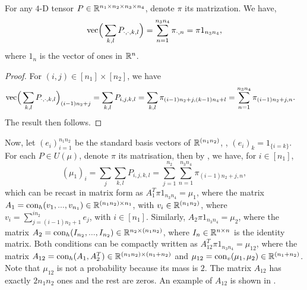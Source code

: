 \begin{lemma} \label{vec_mat}
  For any $4$-D tensor $P \in \mathbb R^{n_1 \times n_2 \times n_3 \times n_4}$,
  denote $\pi$ its matrization. We have,
  \begin{equation}
    \text{vec} \Big( \sum_{k,l} P_{\cdot, \cdot, k, l} \Big) = \sum_{n=1}^{n_3 n_4} \pi_{\cdot, n} = \pi 1_{n_3 n_4},
  \end{equation}
  where $1_n$ is the vector of ones in $\mathbb R^n$.
\end{lemma}
\begin{proof}
For $(i,j) \in [n_1] \times [n_2]$, we have
\begin{align}
    \text{vec} \Big(\sum_{k,l} P_{\cdot,\cdot, k, l}\Big)_{(i-1)n_2 + j} &= \sum_{k,l} P_{i,j,k,l}
    = \sum_{k,l} \pi_{(i-1) n_2 + j, (k-1) n_4 + l}
    = \sum_{n=1}^{n_3 n_4} \pi_{(i-1) n_2 + j, n}.
\end{align}
The result then follows.
\end{proof}
Now, let $(e_i)_{i=1}^{n_1 n_2}$ be the standard basis vectors of $\mathbb R^{(n_1 n_2)}$,
\ie, $(e_i)_k = 1_{\{i=k\}}$. For each $P \in U(\mu)$, denote $\pi$ its matrisation,
then by , we have, for $i \in [n_1]$,
\begin{equation}
  (\mu_1)_i = \sum_j \sum_{k,l} P_{i,j,k,l} = \sum_{j = 1}^{n_2} \sum_{n=1}^{n_3 n_4} \pi_{(i-1) n_2 + j, n},
\end{equation}
which can be recast in matrix form as $A_1^T \pi 1_{n_3 n_4} = \mu_1$,
where the matrix $A_1 = \text{con}_{h}(v_1, ..., v_{n_1}) \in \mathbb R^{(n_1 n_2) \times n_1}$,
with $v_i \in \mathbb R^{(n_1 n_2)}$, where $v_i = \sum_{j=(i-1)n_2 + 1}^{i n_2} e_j$,
with $i \in [n_1]$. Similarly, $A_2 \pi 1_{n_3 n_4} = \mu_2$, where the matrix
$A_2 = \text{con}_h(I_{n_2}, ..., I_{n_2}) \in \mathbb R^{n_2 \times (n_1 n_2)}$,
where $I_n \in \mathbb R^{n \times n}$ is the identity matrix.
Both conditions can be compactly written as $A_{12}^T \pi 1_{n_3 n_4} = \mu_{12}$,
where the matrix $A_{12} = \text{con}_h(A_1, A_2^T) \in \mathbb R^{(n_1 n_2) \times (n_1+n_2)}$ and
$\mu_{12} = \text{con}_v(\mu_1, \mu_2) \in \mathbb R^{(n_1 + n_2)}$.
Note that $\mu_{12}$ is not a probability because its mass is $2$.
The matrix $A_{12}$ has exactly $2n_1n_2$ ones and the rest are zeros.
An example of $A_{12}$ is shown in .

